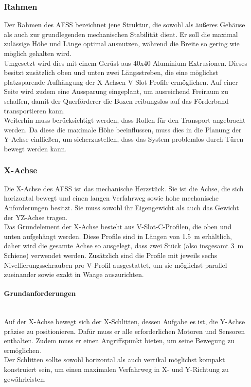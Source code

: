 \subsubsection{Rahmen}

Der Rahmen des AFSS bezeichnet jene Struktur, die sowohl als äußeres Gehäuse als auch zur grundlegenden mechanischen Stabilität dient. Er soll die maximal zulässige Höhe und Länge optimal ausnutzen, während die Breite so gering wie möglich gehalten wird.
\\
Umgesetzt wird dies mit einem Gerüst aus 40x40-Aluminium-Extrusionen. Dieses besitzt zusätzlich oben und unten zwei Längsstreben, die eine möglichst platzsparende Aufhängung der X-Achsen-V-Slot-Profile ermöglichen. Auf einer Seite wird zudem eine Aussparung eingeplant, um ausreichend Freiraum zu schaffen, damit der Querförderer die Boxen reibungslos auf das Förderband transportieren kann.
\\
Weiterhin muss berücksichtigt werden, dass Rollen für den Transport angebracht werden. Da diese die maximale Höhe beeinflussen, muss dies in die Planung der Y-Achse einfließen, um sicherzustellen, dass das System problemlos durch Türen bewegt werden kann.

\subsubsection{X-Achse}
Die X-Achse des AFSS ist das mechanische Herzstück. Sie ist die Achse, die sich horizontal bewegt und einen langen Verfahrweg sowie hohe mechanische Anforderungen besitzt. Sie muss sowohl ihr Eigengewicht als auch das Gewicht der YZ-Achse tragen.
\\
Das Grundelement der X-Achse besteht aus V-Slot-C-Profilen, die oben und unten aufgehängt werden. Diese Profile sind in Längen von \SI{1.5}{\meter} erhältlich, daher wird die gesamte Achse so ausgelegt, dass zwei Stück (also insgesamt \SI{3}{\meter} Schiene) verwendet werden. Zusätzlich sind die Profile mit jeweils sechs Nivellierungsschrauben pro V-Profil ausgestattet, um sie möglichst parallel zueinander sowie exakt in Waage auszurichten.

\paragraph{Grundanforderungen}\mbox{}\\
Auf der X-Achse bewegt sich der X-Schlitten, dessen Aufgabe es ist, die Y-Achse präzise zu positionieren. Dafür muss er alle erforderlichen Motoren und Sensoren enthalten. Zudem muss er einen Angriffspunkt bieten, um seine Bewegung zu ermöglichen.
\\
Der Schlitten sollte sowohl horizontal als auch vertikal möglichst kompakt konstruiert sein, um einen maximalen Verfahrweg in X- und Y-Richtung zu gewährleisten.

